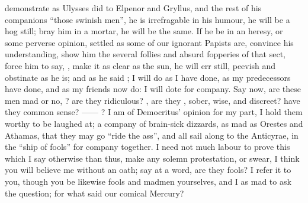 demonstrate as Ulysses did to Elpenor and Gryllus, and the
rest of his companions \enquote{those swinish men}, he is irrefragable in his humour,
he will be a hog still; bray him in a mortar, he will be the same. If he be in
an heresy, or some perverse opinion, settled as some of our ignorant Papists
are, convince his understanding, show him the several follies and absurd
fopperies of that sect, force him to say, , make it as clear
as the sun, he will err still, peevish and obstinate as he
is; and as he said ; I will do as I have done, as my predecessors
have done, and as my friends now do: I will dote for
company. Say now, are these men mad or no,
? are they ridiculous? , are they , sober, wise, and discreet? have
they common sense? ------ ? I
am of Democritus' opinion for my part, I hold them worthy to be laughed at; a
company of brain-sick dizzards, as mad as Orestes and
Athamas, that they may go \enquote{ride the ass}, and all sail along to the Anticyrae,
in the \enquote{ship of fools} for company together. I need not much labour to prove
this which I say otherwise than thus, make any solemn protestation, or swear, I
think you will believe me without an oath; say at a word, are they fools? I
refer it to you, though you be likewise fools and madmen yourselves, and I as
mad to ask the question; for what said our comical Mercury?


